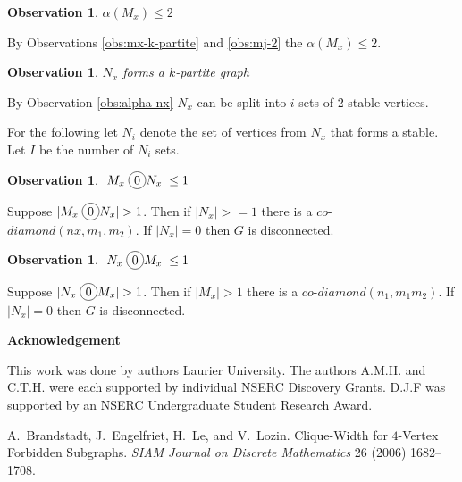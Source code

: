 \documentclass[12pt]{article}
\newcommand*\circled[1]{\tikz[baseline=(char.base)]{
            \node[shape=circle,draw,inner sep=2pt] (char) {#1};}}
\newtheorem{Observation}[Theorem]{Observation}
\begin{document}
\begin{Observation}\label{obs:alpha-mx}
$\alpha(M_x) \leq 2$
\end{Observation}
 By Observations \ref{obs:mx-k-partite} and \ref{obs:mj-2} the $\alpha(M_x) \leq 2$.

\begin{Observation}\label{obs:nx-k-partite}
$N_x$ forms a $k$-partite graph
\end{Observation}
 By Observation \ref{obs:alpha-nx} $N_x$ can be split into $i$ sets of 2 stable vertices. 

For the following let $N_i$ denote the set of vertices from $N_x$ that forms a stable. Let $I$ be the number of $N_i$ sets.

\begin{Observation}\label{obs:mx-disjoin}
$|M_x \;\circled{0} N_x| \leq 1$
\end{Observation}
 Suppose $|M_x \;\circled{0} N_x| > 1$. Then if $|N_x| >= 1$ there is a $co$-$diamond (nx, m_1, m_2)$. If $|N_x| = 0$ then $G$ is disconnected.

\begin{Observation}\label{obs:nx-disjoin}
$|N_x \;\circled{0} M_x| \leq 1$
\end{Observation} 
 Suppose $|N_x \;\circled{0} M_x| > 1$. Then if $|M_x| > 1$ there is a $co$-$diamond (n_1, m_1m_2)$. If $|N_x| = 0$ then $G$ is disconnected.


\begin{center}
{\bf Acknowledgement}
\end{center}
This work was done by authors  Laurier University. The authors A.M.H. and C.T.H. were each supported by individual NSERC Discovery Grants. D.J.F was supported by an NSERC Undergraduate Student Research Award.


\clearpage
\begin{thebibliography}{99}


    A.~Brandstadt, J.~Engelfriet, H.~Le, and V.~Lozin. Clique-Width for $4$-Vertex Forbidden Subgraphs.  {\sl SIAM
     Journal on Discrete Mathematics} 26 (2006) 1682--1708.

\end{thebibliography}
\end{document}
